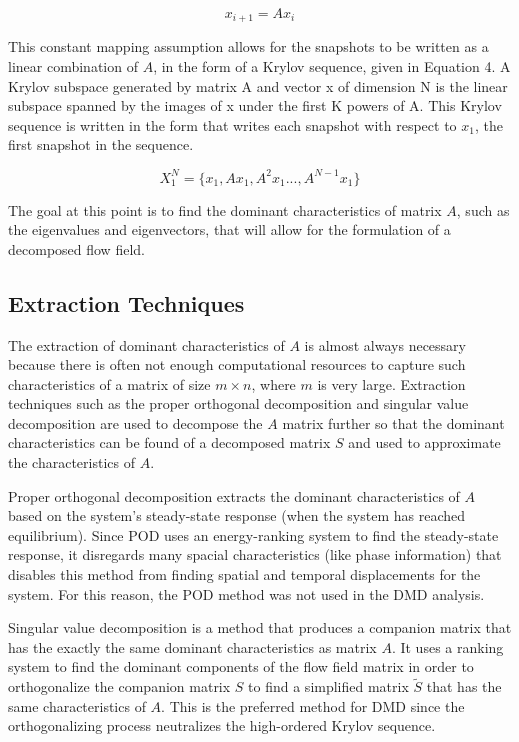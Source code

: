 \documentclass[%
 aip,
 amsmath,amssymb,
 reprint,%
 floatfix,%
]{revtex4-1}
\begin{document}
\begin{equation}
	x_{i+1} = A x_i
\end{equation}

This constant mapping assumption allows for the snapshots to be written as a linear combination of $A$, in the form of a Krylov sequence, given in Equation 4. A Krylov subspace generated by matrix A and vector x of dimension N is the linear subspace spanned by the images of x under the first K powers of A. This Krylov sequence is written in the form that writes each snapshot with respect to $x_1$, the first snapshot in the sequence.

\begin{equation}
	X_1^{N} = \{ x_1, Ax_1, A^{2}x_1 ...,A^{N-1}x_1 \}
\end{equation}

The goal at this point is to find the dominant characteristics of matrix $A$, such as the eigenvalues and eigenvectors, that will allow for the formulation of a decomposed flow field. 

\subsection{Extraction Techniques}

The extraction of dominant characteristics of $A$ is almost always necessary because there is often not enough computational resources to capture such characteristics of a matrix of size $m \times n$, where $m$ is very large. Extraction techniques such as the  proper orthogonal decomposition and singular value decomposition are used to decompose the $A$ matrix further so that the dominant characteristics can be found of a decomposed matrix $S$ and used to approximate the characteristics of $A$.

Proper orthogonal decomposition extracts the dominant characteristics of $A$ based on the system's steady-state response (when the system has reached equilibrium). Since POD uses an energy-ranking system to find the steady-state response, it disregards many spacial characteristics (like phase information) that disables this method from finding spatial and temporal displacements for the system. For this reason, the POD method was not used in the DMD analysis.

Singular value decomposition is a method that produces a companion matrix that has the exactly the same dominant characteristics as matrix $A$. It uses a ranking system to find the dominant components of the flow field matrix in order to orthogonalize the companion matrix $S$ to find a simplified matrix $\tilde S$ that has the same characteristics of $A$. This is the preferred method for DMD since the orthogonalizing process neutralizes the high-ordered Krylov sequence.
\end{document}
